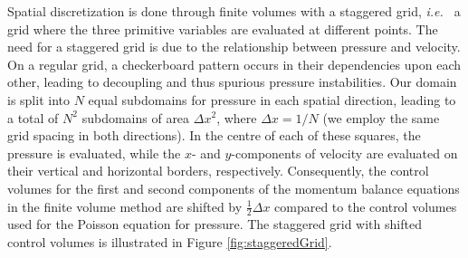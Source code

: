 \documentclass[final,3p,twocolumn]{elsarticle}
\begin{document}
Spatial discretization is done through finite volumes with a staggered grid,
{\em i.e.\ } a grid where the three primitive variables are evaluated at
different points.  The need for a staggered grid is due to the relationship
between pressure and velocity. On a regular grid, a checkerboard pattern occurs
in their dependencies upon each other, leading to decoupling and thus spurious
pressure instabilities.  Our domain is split into $N$ equal subdomains for
pressure in each spatial direction, leading to a total of $N^2$ subdomains of
area $\Delta x^2$, where $\Delta x = 1/N$ (we employ the same grid spacing in
both directions). In the centre of each of these squares, the pressure is
evaluated, while the $x$- and $y$-components of velocity are evaluated on their
vertical and horizontal borders, respectively.  Consequently, the control
volumes for the first and second components of the momentum balance equations
in the finite volume method are shifted by $\frac{1}{2} \Delta x$ compared to
the control volumes used for the Poisson equation for pressure. The staggered
grid with shifted control volumes is illustrated in Figure
\ref{fig:staggeredGrid}.
\end{document}
